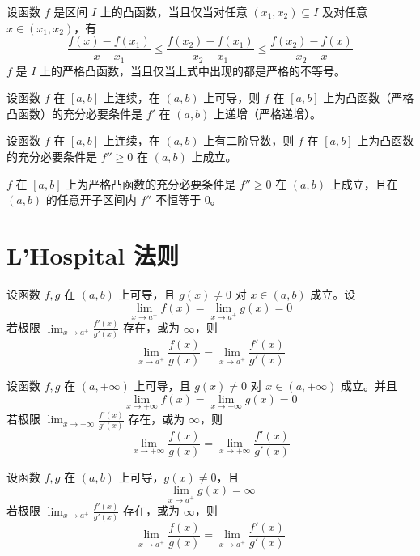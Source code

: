 \begin{theorem}
  设函数 $f$ 是区间 $I$ 上的凸函数，当且仅当对任意 $(x_1,x_2) \subseteq I$ 及对任意 $x \in (x_1,x_2)$，有
  \[\frac{f(x) - f(x_1)}{x - x_1} \leqslant \frac{f(x_2) - f(x_1)}{x_2 - x_1} \leqslant \frac{f(x_2) - f(x)}{x_2 - x}\]
  $f$ 是 $I$ 上的严格凸函数，当且仅当上式中出现的都是严格的不等号。
\end{theorem}

\begin{theorem}
  设函数 $f$ 在 $[a,b]$ 上连续，在 $(a,b)$ 上可导，则 $f$ 在 $[a,b]$ 上为凸函数（严格凸函数）的充分必要条件是 $f'$ 在 $(a,b)$ 上递增（严格递增）。
\end{theorem}

\begin{theorem}
  设函数 $f$ 在 $[a,b]$ 上连续，在 $(a,b)$ 上有二阶导数，则 $f$ 在 $[a,b]$ 上为凸函数的充分必要条件是 $f'' \geqslant 0$ 在 $(a,b)$ 上成立。

  $f$ 在 $[a,b]$ 上为严格凸函数的充分必要条件是 $f'' \geqslant 0$ 在 $(a,b)$ 上成立，且在 $(a,b)$ 的任意开子区间内 $f''$ 不恒等于 $0$。
\end{theorem}

\section{L'Hospital 法则}

\begin{theorem}
  设函数 $f,g$ 在 $(a,b)$ 上可导，且 $g(x) \ne 0$ 对 $x \in (a,b)$ 成立。设
  \[\lim_{x \to a^{+}}f(x) = \lim_{x \to a^{+}}g(x) = 0\]
  若极限  $\displaystyle \lim_{x \to a^{+}}\frac{f'(x)}{g'(x)}$ 存在，或为 $\infty$，则
  \[\lim_{x \to a^{+}}\frac{f(x)}{g(x)} = \lim_{x \to a^{+}}\frac{f'(x)}{g'(x)}\]
\end{theorem}

\begin{theorem}
  设函数 $f,g$ 在 $(a,+\infty)$ 上可导，且 $g(x) \ne 0$ 对 $x \in (a,+\infty)$ 成立。并且
  \[\lim_{x \to +\infty}f(x) = \lim_{x \to +\infty}g(x) = 0\]
  若极限 $\displaystyle \lim_{x \to +\infty}\frac{f'(x)}{g'(x)}$ 存在，或为 $\infty$，则
  \[\lim_{x \to +\infty}\frac{f(x)}{g(x)} = \lim_{x \to +\infty}\frac{f'(x)}{g'(x)}\]
\end{theorem}

\begin{theorem}
  设函数 $f,g$ 在 $(a,b)$ 上可导，$g(x) \ne 0$，且
  \[ \lim_{x \to a^{+}}g(x) = \infty\]
  若极限  $\displaystyle \lim_{x \to a^{+}}\frac{f'(x)}{g'(x)}$ 存在，或为 $\infty$，则
  \[\lim_{x \to a^{+}}\frac{f(x)}{g(x)} = \lim_{x \to a^{+}}\frac{f'(x)}{g'(x)}\]
\end{theorem}


